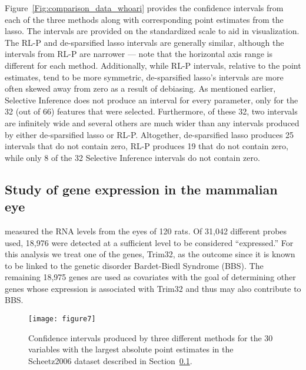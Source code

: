 Figure~\ref{Fig:comparison_data_whoari} provides the confidence intervals from each of the three methods along with corresponding point estimates from the lasso. The intervals are provided on the standardized scale to aid in visualization. The RL-P and de-sparsified lasso intervals are generally similar, although the intervals from RL-P are narrower --- note that the horizontal axis range is different for each method. Additionally, while RL-P intervals, relative to the point estimates, tend to be more symmetric, de-sparsified lasso's intervals are more often skewed away from zero as a result of debiasing. As mentioned earlier, Selective Inference does not produce an interval for every parameter, only for the 32 (out of 66) features that were selected. Furthermore, of these 32, two intervals are infinitely wide and several others are much wider than any intervals produced by either de-sparsified lasso or RL-P. Altogether, de-sparsified lasso produces 25 intervals that do not contain zero, RL-P produces 19 that do not contain zero, while only 8 of the 32 Selective Inference intervals do not contain zero.

\subsection{Study of gene expression in the mammalian eye}\label{Sec:Scheetz2006}

\citet{Scheetz2006} measured the RNA levels from the eyes of 120 rats. Of 31,042 different probes used, 18,976 were detected at a sufficient level to be considered ``expressed.'' For this analysis we treat one of the genes, Trim32, as the outcome since it is known to be linked to the genetic disorder Bardet-Biedl Syndrome (BBS). The remaining 18,975 genes are used as covariates with the goal of determining other genes whose expression is associated with Trim32 and thus may also contribute to BBS.

\begin{figure}[htb!]
  \begin{center}
    \texttt{[image: figure7]}
    \caption{\label{Fig:comparison_data_scheetz} Confidence intervals produced by three different methods for the 30 variables with the largest absolute point estimates in the Scheetz2006 dataset described in Section~\ref{Sec:Scheetz2006}.}
  \end{center}
\end{figure}

